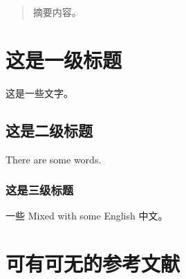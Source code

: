 \documentclass[UTF8,zihao=-4,linespread=1.5]{ctexart}
\begin{document}
\begin{abstract}

    摘要内容。

\end{abstract}

\newpage

\section{这是一级标题}
\label{sec:this_is_a_section}

这是一些文字。

\subsection{这是二级标题}
\label{subsec:this_is_a_subsection}

There are some words.

\subsubsection{这是三级标题}
\label{subsubsec:this_is_a_subsubsection}

一些 Mixed with some English 中文。

\section*{可有可无的参考文献}
\label{sec:references}
\end{document}
